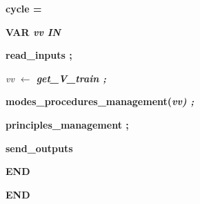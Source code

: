 \begin{minipage}{20cm}
\vspace*{4mm}
\hspace*{0.15in}\bf cycle \rm =

\hspace*{0.15in}\bf VAR \it vv \bf IN

\hspace*{0.35in}\bf read\_inputs \rm ;

\hspace*{0.35in}

\hspace*{0.35in}\it vv  $\leftarrow$  \bf get\_V\_train \rm ;

\hspace*{0.35in}

\hspace*{0.35in}\bf modes\_procedures\_management\rm (\it vv\rm ) \rm ; \hspace*{0.75in}

\hspace*{0.35in}\bf principles\_management \rm ; \hspace*{0.20in}

\hspace*{0.35in}\bf send\_outputs

\hspace*{0.15in}\bf END

\vspace*{8mm}
\bf END

\end{minipage}
